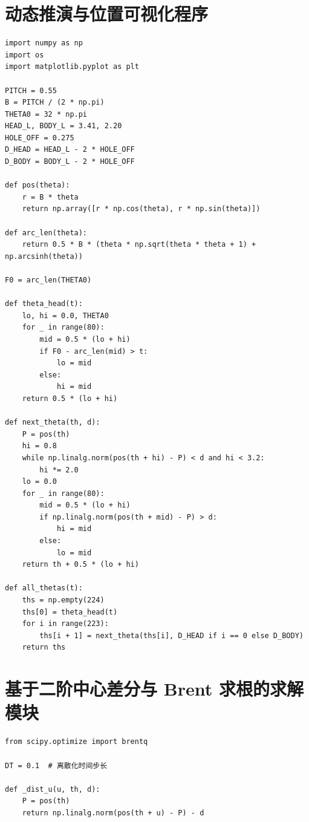 ﻿\documentclass{cumcmthesis}
\begin{document}
\newpage
\begin{appendices}

\section{动态推演与位置可视化程序}
\begin{lstlisting}
import numpy as np
import os
import matplotlib.pyplot as plt

PITCH = 0.55
B = PITCH / (2 * np.pi)
THETA0 = 32 * np.pi
HEAD_L, BODY_L = 3.41, 2.20
HOLE_OFF = 0.275
D_HEAD = HEAD_L - 2 * HOLE_OFF
D_BODY = BODY_L - 2 * HOLE_OFF

def pos(theta):
    r = B * theta
    return np.array([r * np.cos(theta), r * np.sin(theta)])

def arc_len(theta):
    return 0.5 * B * (theta * np.sqrt(theta * theta + 1) + np.arcsinh(theta))

F0 = arc_len(THETA0)

def theta_head(t):
    lo, hi = 0.0, THETA0
    for _ in range(80):
        mid = 0.5 * (lo + hi)
        if F0 - arc_len(mid) > t:
            lo = mid
        else:
            hi = mid
    return 0.5 * (lo + hi)

def next_theta(th, d):
    P = pos(th)
    hi = 0.8
    while np.linalg.norm(pos(th + hi) - P) < d and hi < 3.2:
        hi *= 2.0
    lo = 0.0
    for _ in range(80):
        mid = 0.5 * (lo + hi)
        if np.linalg.norm(pos(th + mid) - P) > d:
            hi = mid
        else:
            lo = mid
    return th + 0.5 * (lo + hi)

def all_thetas(t):
    ths = np.empty(224)
    ths[0] = theta_head(t)
    for i in range(223):
        ths[i + 1] = next_theta(ths[i], D_HEAD if i == 0 else D_BODY)
    return ths
\end{lstlisting}

\section{基于二阶中心差分与 Brent 求根的求解模块}
\begin{lstlisting}
from scipy.optimize import brentq

DT = 0.1  # 离散化时间步长

def _dist_u(u, th, d):
    P = pos(th)
    return np.linalg.norm(pos(th + u) - P) - d


\end{lstlisting}
\end{appendices}
\end{document}
